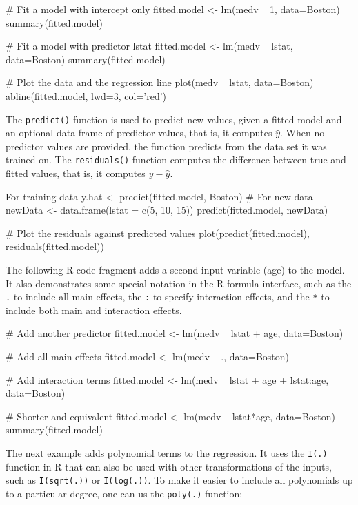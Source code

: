 \begin{samepage}
\begin{Rcode}
# Fit a model with intercept only
fitted.model <- lm(medv ~ 1, data=Boston)
summary(fitted.model)

# Fit a model with predictor lstat
fitted.model <- lm(medv ~ lstat, data=Boston)
summary(fitted.model)

# Plot the data and the regression line
plot(medv ~ lstat, data=Boston)
abline(fitted.model, lwd=3, col='red')
\end{Rcode}

The \texttt{predict()} function is used to predict new values, given a fitted model and an optional data frame of predictor values, that is, it computes $\hat{y}$. When no predictor values are provided, the function predicts from the data set it was trained on. The \texttt{residuals()} function computes the difference between true and fitted values, that is, it computes $y - \hat{y}$.

\begin{Rcode}
For training data
y.hat <- predict(fitted.model, Boston)
# For new data
newData <- data.frame(lstat = c(5, 10, 15))
predict(fitted.model, newData)

# Plot the residuals against predicted values
plot(predict(fitted.model), residuals(fitted.model))
\end{Rcode}
\end{samepage}

The following R code fragment adds a second input variable (age) to the model. It also demonstrates some special notation in the R formula interface, such as the \texttt{.} to include all main effects, the \texttt{:} to specify interaction effects, and the \texttt{*} to include both main and interaction effects.

\begin{samepage}
\begin{Rcode}
# Add another predictor
fitted.model <- lm(medv ~ lstat + age, data=Boston)

# Add all main effects
fitted.model <- lm(medv ~ ., data=Boston)

# Add interaction terms
fitted.model <- lm(medv ~ lstat + age + lstat:age, data=Boston)
   
# Shorter and equivalent
fitted.model <- lm(medv ~ lstat*age, data=Boston)
summary(fitted.model)
\end{Rcode}
\end{samepage}

The next example adds polynomial terms to the regression. It uses the \texttt{I(.)} function in R that can also be used with other transformations of the inputs, such as \texttt{I(sqrt(.))} or \texttt{I(log(.))}. To make it easier to include all polynomials up to a particular degree, one can us the \texttt{poly(.)} function:


